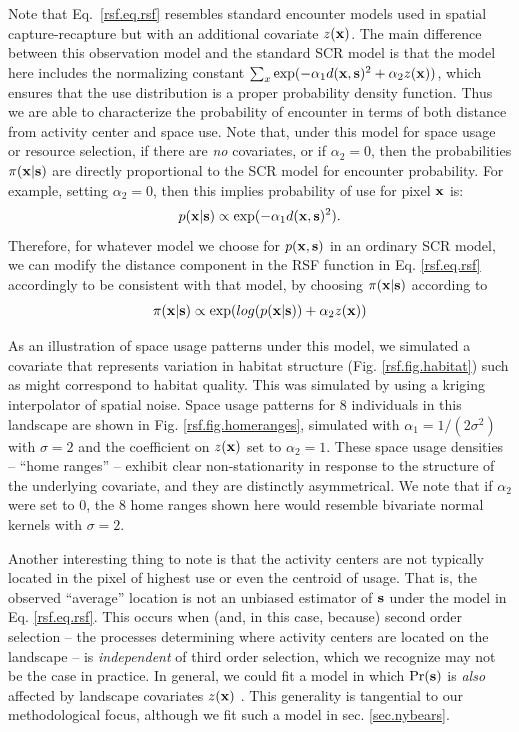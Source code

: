 \documentclass[12pt]{article}
\begin{document}
Note that Eq.~\ref{rsf.eq.rsf} resembles standard encounter models
used in spatial capture-recapture but with an additional covariate
$z({\bf x})$.  The main difference between this observation model and
the standard SCR model is that the model here includes the normalizing
constant $\sum_{x} \exp(-\alpha_{1} d({\bf x},{\bf s})^{2} +\alpha_{2}
z({\bf x}))$, which ensures that the use distribution is a proper
probability density function. Thus we are able to characterize the
probability of encounter in terms of both distance from activity
center and space use.
Note that, under this model for space usage or resource selection, if
there are {\it no} covariates, or if $\alpha_{2} = 0$, then the
probabilities $\pi({\bf x}|{\bf s})$ are directly proportional to the
SCR model for encounter probability.  For example, setting $\alpha_{2}
= 0$, then this implies probability of use for pixel ${\bf x}$ is:
\[
p({\bf x}|{\bf s}) \propto  \exp( -\alpha_{1} d({\bf x},{\bf s})^{2}).
\]
Therefore,
for whatever model we choose for
$p({\bf x},{\bf s})$ in an ordinary SCR model, we can modify the distance
component in the RSF function in Eq. \ref{rsf.eq.rsf} accordingly to
be consistent with that model, by choosing $\pi({\bf x}|{\bf s})$
according to
\[
\pi({\bf x}|{\bf s}) \propto \exp( log(p({\bf x}|{\bf s})) + \alpha_{2} z({\bf x}))
\]


As an illustration of space usage patterns under this model, we
simulated a covariate that represents variation in habitat structure
(Fig. \ref{rsf.fig.habitat}) such as might correspond to habitat
quality.
This was simulated by using a
 kriging interpolator  of spatial noise.
Space usage patterns for
 8 individuals in this landscape are shown in Fig. \ref{rsf.fig.homeranges},
simulated with $\alpha_{1} = 1/(2\sigma^2)$ with $\sigma = 2$ and the
coefficient on $z({\bf x})$ set to $\alpha_{2} = 1$.
These space usage densities -- ``home ranges'' -- exhibit clear
non-stationarity in response to the structure of the underlying
covariate, and they are distinctly asymmetrical.  We note that if
$\alpha_{2}$ were set to 0, the 8 home ranges shown here would
resemble bivariate normal kernels with $\sigma = 2$.

Another
interesting thing to note is that the activity centers are not
typically located in the pixel of highest use or even the centroid of
usage. That is, the observed ``average'' location is not an unbiased
estimator of ${\bf s}$ under the model in Eq. \ref{rsf.eq.rsf}.
This occurs when (and, in this case, because) second order selection
-- the processes determining where activity centers are located on the
landscape -- is {\it independent} of third order selection, which we recognize may
not be the case in practice. In general, we could fit a model in which
$\Pr({\bf s})$ is {\it also} affected by
landscape covariates $z({\bf x})$ \citep{borchers_efford:2008}. This
generality is tangential to our methodological focus, although we fit
such a model in sec. \ref{sec.nybears}.
\end{document}
